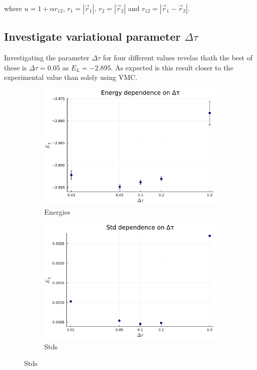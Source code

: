 \documentclass[
	a4paper, %
	10pt, %
]{CSUniSchoolLabReport}
\begin{document}
where $u = 1+\alpha r_{12}$, $r_1 = |\Vec r_1|$, $r_2 = |\Vec r_2|$ and $r_{12} = |\Vec r_1 - \Vec r_2|$.

\subsection{Investigate variational parameter $\Delta\tau$}

Investigating the parameter $\Delta \tau$ for four different values revelas thath the best of these is $\Delta \tau=0.05$ as $E_L=-2.895$. As expected is this result closer to the experimental value than solely using VMC.

\begin{figure}[H]
	\begin{subfigure}[b]{0.49\textwidth}
		\centering
		\includegraphics[width=\textwidth]{../saves/task1g.avEnergies.pdf}
		\caption{Energies}
	\end{subfigure}
	\hfill
	\begin{subfigure}[b]{0.49\textwidth}
		\centering
		\includegraphics[width=\textwidth]{../saves/task1g.avStd.pdf}
		\caption{Stds}
	\end{subfigure}
\end{figure}
\end{document}
